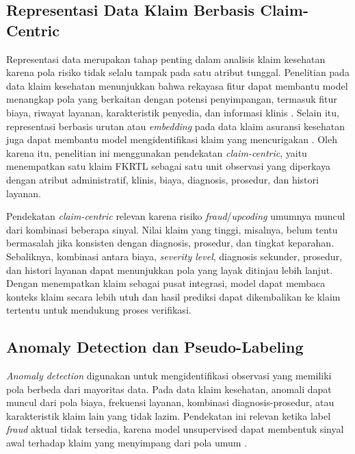 \subsection{Representasi Data Klaim Berbasis Claim-Centric}\label{representasi-data-klaim-berbasis-claim-centric}

Representasi data merupakan tahap penting dalam analisis klaim kesehatan karena pola risiko tidak selalu tampak pada satu atribut tunggal. Penelitian pada data klaim kesehatan menunjukkan bahwa rekayasa fitur dapat membantu model menangkap pola yang berkaitan dengan potensi penyimpangan, termasuk fitur biaya, riwayat layanan, karakteristik penyedia, dan informasi klinis \citep{kumaraswamy2022}. Selain itu, representasi berbasis urutan atau \emph{embedding} pada data klaim asuransi kesehatan juga dapat membantu model mengidentifikasi klaim yang mencurigakan \citep{fursov2019sequence}. Oleh karena itu, penelitian ini menggunakan pendekatan \emph{claim-centric}, yaitu menempatkan satu klaim FKRTL sebagai satu unit observasi yang diperkaya dengan atribut administratif, klinis, biaya, diagnosis, prosedur, dan histori layanan.

Pendekatan \emph{claim-centric} relevan karena risiko \emph{fraud}/\emph{upcoding} umumnya muncul dari kombinasi beberapa sinyal. Nilai klaim yang tinggi, misalnya, belum tentu bermasalah jika konsisten dengan diagnosis, prosedur, dan tingkat keparahan. Sebaliknya, kombinasi antara biaya, \emph{severity level}, diagnosis sekunder, prosedur, dan histori layanan dapat menunjukkan pola yang layak ditinjau lebih lanjut. Dengan menempatkan klaim sebagai pusat integrasi, model dapat membaca konteks klaim secara lebih utuh dan hasil prediksi dapat dikembalikan ke klaim tertentu untuk mendukung proses verifikasi.

\subsection{Anomaly Detection dan Pseudo-Labeling}\label{anomaly-detection-dan-pseudo-labeling}

\emph{Anomaly detection} digunakan untuk mengidentifikasi observasi yang memiliki pola berbeda dari mayoritas data. Pada data klaim kesehatan, anomali dapat muncul dari pola biaya, frekuensi layanan, kombinasi diagnosis-prosedur, atau karakteristik klaim lain yang tidak lazim. Pendekatan ini relevan ketika label \emph{fraud} aktual tidak tersedia, karena model unsupervised dapat membentuk sinyal awal terhadap klaim yang menyimpang dari pola umum \citep{shekhar2023,settipalli2023,meulemeester2025}.

